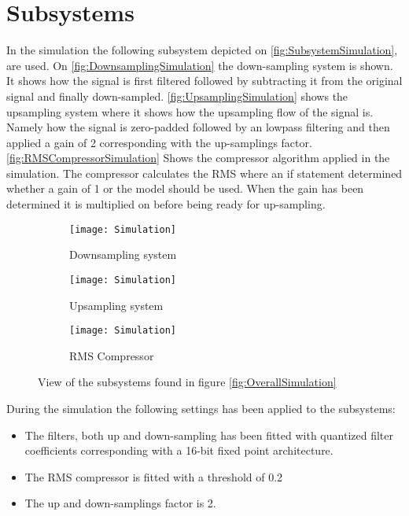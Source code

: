 \section{Subsystems}
In the simulation the following subsystem depicted on \autoref{fig:SubsystemSimulation}, are used. On \autoref{fig:DownsamplingSimulation} the down-sampling system is shown. It shows how the signal is first filtered followed by subtracting it from the original signal and finally down-sampled. \autoref{fig:UpsamplingSimulation} shows the upsampling system where it shows how the upsampling flow of the signal is. Namely how the signal is zero-padded followed by an lowpass filtering and then applied a gain of 2 corresponding with the up-samplings factor. \autoref{fig:RMSCompressorSimulation} Shows the compressor algorithm applied in the simulation. The compressor calculates the RMS where an if statement determined whether a gain of 1 or the model should be used. When the gain has been determined it is multiplied on before being ready for up-sampling. 
\begin{figure}[H]
\centering
\begin{subfigure}[t]{0.49\textwidth}
    \centering
\texttt{[image: Simulation]}
    \caption{Downsampling system}
    \label{fig:DownsamplingSimulation}
\end{subfigure}
\begin{subfigure}[t]{0.49\textwidth}
    \centering
\texttt{[image: Simulation]}
    \caption{Upsampling system}
    \label{fig:UpsamplingSimulation}
\end{subfigure}
\begin{subfigure}[t]{\textwidth}
    \centering
\texttt{[image: Simulation]}
    \caption{RMS Compressor}
    \label{fig:RMSCompressorSimulation}
\end{subfigure}
\label{fig:SubsystemSimulation}
\caption{View of the subsystems found in figure \ref{fig:OverallSimulation}}
\end{figure}


During the simulation the following settings has been applied to the subsystems:
\begin{itemize}
\item The filters, both up and down-sampling has been fitted with quantized filter coefficients corresponding with a 16-bit fixed point architecture.
\item The RMS compressor is fitted with a threshold of 0.2 
\item The up and down-samplings factor is 2.
\end{itemize}


